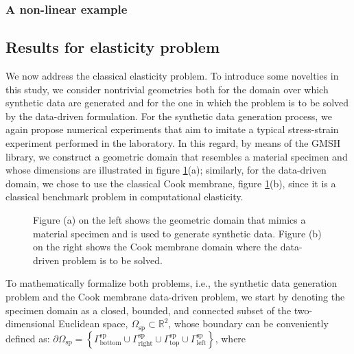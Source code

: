 \clearpage
\subsubsection{A non-linear example}



\clearpage
\subsection{Results for elasticity problem}

We now address the classical elasticity problem. To introduce some novelties in this study, we consider nontrivial geometries both for the domain over which synthetic data are generated and for the one in which the problem is to be solved by the data-driven formulation. For the synthetic data generation process, we again propose numerical experiments that aim to imitate a typical stress-strain experiment performed in the laboratory. In this regard, by means of the GMSH library, we construct a geometric domain that resembles a material specimen and whose dimensions are illustrated in figure \ref{fig:compound_meshes_elastostatic}(a); similarly, for the data-driven domain, we chose to use the classical Cook membrane, figure \ref{fig:compound_meshes_elastostatic}(b), since it is a classical benchmark problem in computational elasticity.

\begin{figure}[h!]
	\centering
	\caption{Figure (a) on the left shows the geometric domain that mimics a material specimen and is used to generate synthetic data. Figure (b) on the right shows the Cook membrane domain where the data-driven problem is to be solved.}
	\def\svgwidth{\columnwidth}
	
	\label{fig:compound_meshes_elastostatic}
\end{figure}


To mathematically formalize both problems, i.e., the synthetic data generation problem and the Cook membrane data-driven problem, we start by denoting the specimen domain as a closed, bounded, and connected subset of the two-dimensional Euclidean space, $ \Omega_{\text{sp}} \subset \mathbb{R}^{2} $, whose boundary can be conveniently defined as: $ \partial \Omega_{\text{sp}} = \left\{\Gamma_{\text{bottom}}^{\text{sp}} \cup \Gamma_{\text{right}}^{\text{sp}} \cup \Gamma_{\text{top}}^{\text{sp}} \cup \Gamma_{\text{left}}^{\text{sp}} \right\} $, where 

